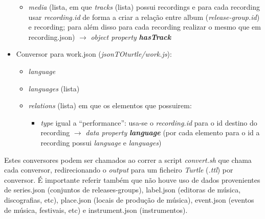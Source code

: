 \documentclass{article}
\begin{document}
\begin{itemize}
\begin{itemize}
            \item \textit{media} (lista, em que \textit{tracks} (lista) possui recordings e para cada recording usar \textit{recording.id} de forma a criar a relação entre album (\textit{release-group.id}) e recording; para além disso para cada recording realizar o mesmo que em recording.json) $\to$ \textit{object property} \textit{\textbf{hasTrack}}
        \end{itemize}
    \item Conversor para work.json (\textit{jsonTOturtle/work.js}):
        \begin{itemize}
            \item \textit{language}
            \item \textit{languages} (lista)
            \item \textit{relations} (lista) em que os elementos que possuirem:
                \begin{itemize}
                    \item \textit{type} igual a ``performance'': usa-se o \textit{recording.id} para o id destino do recording $\to$ \textit{data property} \textit{\textbf{language}} (por cada elemento para o id a recording possui \textit{language} e \textit{languages})
                \end{itemize}
        \end{itemize}
\end{itemize}

Estes conversores podem ser chamados ao correr a script \textit{convert.sh} que chama cada conversor, redirecionando o \textit{output} para um ficheiro \textit{Turtle} (\textit{.ttl}) por conversor. É importante referir também que não houve uso de dados provenientes de series.json (conjuntos de releases-groups), label.json (editoras de música, discografias, etc), place.json (locais de produção de música), event.json (eventos de música, festivais, etc) e instrument.json (instrumentos).
\end{document}
